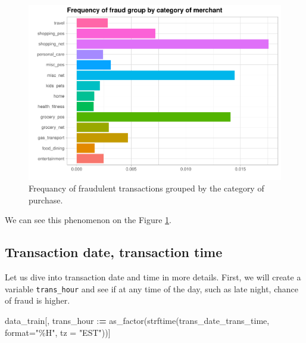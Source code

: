 \documentclass[
]{report}
\newenvironment{Shaded}{\begin{snugshade}}{\end{snugshade}}
\newcommand{\AttributeTok}[1]{\textcolor[rgb]{0.77,0.63,0.00}{#1}}
\newcommand{\ErrorTok}[1]{\textcolor[rgb]{0.64,0.00,0.00}{\textbf{#1}}}
\newcommand{\FunctionTok}[1]{\textcolor[rgb]{0.00,0.00,0.00}{#1}}
\newcommand{\NormalTok}[1]{#1}
\newcommand{\SpecialCharTok}[1]{\textcolor[rgb]{0.00,0.00,0.00}{#1}}
\newcommand{\StringTok}[1]{\textcolor[rgb]{0.31,0.60,0.02}{#1}}
\begin{document}
\begin{figure}
\centering
\includegraphics{credit_card_fraud_detection_files/figure-latex/category_plot-1.pdf}
\caption{\label{Fig:category_plot}Frequancy of fraudulent transactions
grouped by the category of purchase.}
\end{figure}

We can see this phenomenon on the Figure \ref{Fig:category_plot}.

\hypertarget{transaction-date-transaction-time}{%
\subsection{Transaction date, transaction
time}\label{transaction-date-transaction-time}}

Let us dive into transaction date and time in more details. First, we
will create a variable \texttt{trans\_hour} and see if at any time of
the day, such as late night, chance of fraud is higher.

\begin{Shaded}
\begin{Highlighting}[]
\NormalTok{data\_train[, trans\_hour }\SpecialCharTok{:}\ErrorTok{=} \FunctionTok{as\_factor}\NormalTok{(}\FunctionTok{strftime}\NormalTok{(trans\_date\_trans\_time, }
                                              \AttributeTok{format=}\StringTok{"\%H"}\NormalTok{, }
                                              \AttributeTok{tz =} \StringTok{"EST"}\NormalTok{))]}
\end{Highlighting}
\end{Shaded}
\end{document}
